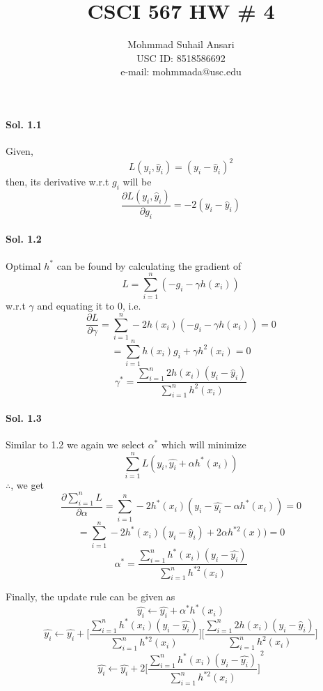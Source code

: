 \documentclass[]{report}
\title{CSCI 567 HW \# 4}
\author{Mohmmad Suhail Ansari \\ USC ID: 8518586692\\e-mail: mohmmada@usc.edu}
\begin{document}
\maketitle

\paragraph{Sol. 1.1}
	Given, 
	\[ L(y_i, \hat{y}_i) = (y_i - \hat{y}_i)^2\]
	then, its derivative w.r.t $g_i$ will be
	\[ \frac{\partial{L(y_i, \hat{y}_i)}}{\partial{g_i}} = -2(y_i - \hat{y}_i)\]

\paragraph{Sol. 1.2}
	Optimal $h^{*}$ can be found by calculating the gradient of 
	\[ L = \sum_{i = 1}^{n} (-g_i - \gamma h(x_i)) \]
	 w.r.t $\gamma$ and equating it to 0, i.e.
	 \[ \frac{\partial{L}}{\partial{\gamma}} = \sum_{i = 1}^{n} - 2h(x_i)(-g_i - \gamma h(x_i)) = 0\]
	 \[ = \sum_{i = 1}^{n} h(x_i) g_i + \gamma h^2 (x_i) = 0\]
	 \[ \gamma^{*} = \frac{\sum_{i = 1}^{n}  2 h(x_i)(y_i - \hat{y}_i)}{\sum_{i = 1}^{n} h^2 (x_i)}\]

\paragraph{Sol. 1.3}
	Similar to 1.2 we again we select $\alpha^{*}$ which will minimize 
	\[ \sum_{i = 1}^{n}  L(y_i, \hat{y_i} + \alpha h^{*}(x_i)) \]
	$\therefore$, we get
	\[ \frac{\partial{\sum_{i = 1}^{n}  L}}{\partial{\alpha}} = \sum_{i = 1}^{n} -2 h^{*}(x_i) (y_i - \hat{y_i} - \alpha h^{*}(x_i)) = 0 \]
	\[ = \sum_{i = 1}^{n}  -2h^{*}(x_i)(y_i - \hat{y}_i) + 2 \alpha h^{*2}(x)) = 0\]
	\[ \alpha^{*} = \frac{\sum_{i = 1}^{n} h^{*}(x_i)(y_i - \hat{y_i})}{\sum_{i = 1}^{n} h^{*2}(x_i)}\]
	
	Finally, the update rule can be given as 
	\[ \hat{y_i} \leftarrow \hat{y_i} + \alpha^{*} h^{*}(x_i) \]
	\[ \hat{y_i} \leftarrow \hat{y_i} + \bigg[ \frac{\sum_{i = 1}^{n} h^{*}(x_i)(y_i - \hat{y_i})}{\sum_{i = 1}^{n} h^{*2}(x_i)}  \bigg] \bigg[ \frac{\sum_{
	i = 1}^{n}  2 h(x_i)(y_i - \hat{y}_i)}{\sum_{i = 1}^{n} h^2 (x_i)} \bigg] \]
	\[ \hat{y_i} \leftarrow \hat{y_i} + 2{\bigg[ \frac{\sum_{i = 1}^{n} h^{*}(x_i)(y_i - \hat{y_i})}{\sum_{i = 1}^{n} h^{*2}(x_i)} \bigg]}^2 \]
\end{document}
